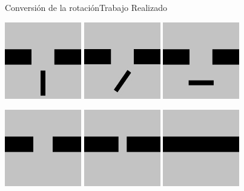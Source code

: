 \documentclass[10pt]{beamer}
\begin{document}
\begin{frame}{Conversión de la rotación}{Trabajo Realizado}
\vspace{0.7cm}
\begin{center}
\includegraphics[width=0.25\textwidth]{b2} \hspace{0.5cm}
\includegraphics[width=0.25\textwidth]{b1} \hspace{0.5cm}
\includegraphics[width=0.25\textwidth]{b0}
\vspace{0.7cm}

\includegraphics[width=0.25\textwidth]{n2} \hspace{0.5cm}
\includegraphics[width=0.25\textwidth]{n1} \hspace{0.5cm}
\includegraphics[width=0.25\textwidth]{n0}
\end{center}
\end{frame}
\end{document}
